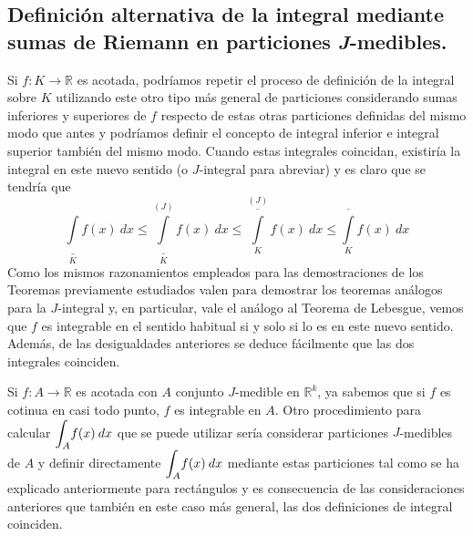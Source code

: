 \documentclass[12pt,twoside]{report}
\theoremstyle{azul}
\theoremstyle{azul2}
\theoremstyle{plain}
\theoremstyle{definition}
\theoremstyle{remark}
\begin{document}
\subsection{Definición alternativa de la integral mediante sumas de Riemann en particiones \textit{J}-medibles.}
Si $f: K \longrightarrow \mathbb{R}$ es acotada, podríamos repetir el proceso de definición de la integral sobre $K$ utilizando este otro tipo más general de particiones considerando sumas inferiores y superiores de $f$ respecto de estas otras particiones definidas del mismo modo que antes y podríamos definir el concepto de integral inferior e integral superior también del mismo modo. Cuando estas integrales coincidan, existiría la integral en este nuevo sentido (o $J$-integral para abreviar) y es claro que se tendría que 
$$\underset{K}{\underline{\int}} f(x) \: dx \leq \overset{(J)}{\underset{K}{\underline{\int}}} f(x) \: dx \leq \overset{(J)}{\underset{K}{\overline{\int}}} f(x) \: dx \leq \underset{K}{\overline{\int}} f(x) \: dx $$
Como los mismos razonamientos empleados para las demostraciones de los Teoremas previamente estudiados valen para demostrar los teoremas análogos para la $J$-integral y, en particular, vale el análogo al Teorema de Lebesgue, vemos que $f$ es integrable en el sentido habitual si y solo si lo es en este nuevo sentido. Además, de las desigualdades anteriores se deduce fácilmente que las dos integrales coinciden.

Si $f: A \longrightarrow \mathbb{R}$ es acotada con $A$ conjunto $J$-medible en $\mathbb{R}^k$, ya sabemos que si $f$ es cotinua en casi todo punto, $f$ es integrable en $A$. Otro procedimiento para calcular $\mathlarger{\int_A} f(x) \: dx$ que se puede utilizar sería considerar particiones $J$-medibles de $A$ y definir directamente $\mathlarger{\int_A} f(x) \: dx$ mediante estas particiones tal como se ha explicado anteriormente para rectángulos y es consecuencia de las consideraciones anteriores que también en este caso más general, las dos definiciones de integral coinciden.
\end{document}
